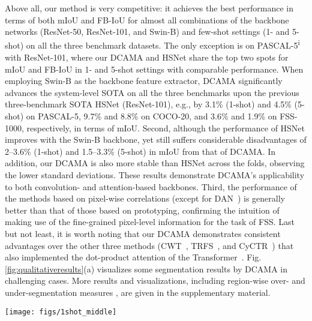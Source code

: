 \documentclass[runningheads,table,xcdraw]{llncs}
\begin{document}
Above all, our method
{\color{blue} is very competitive: it achieves the best performance in terms of both mIoU and FB-IoU for almost all combinations of the backbone networks (ResNet-50, ResNet-101, and Swin-B) and few-shot settings (1- and 5-shot) on all the three benchmark datasets.
The only exception is on PASCAL-5\textsuperscript{i} with ResNet-101, where {\color{red}our DCAMA and HSNet \cite{min2021hypercorrelation} share the top two spots for mIoU and FB-IoU in 1- and 5-shot settings with comparable performance}.
When employing Swin-B as the backbone feature extractor, DCAMA significantly advances the system-level SOTA on all the three benchmarks upon the previous three-benchmark SOTA HSNet (ResNet-101), e.g., by 3.1\% (1-shot) and 4.5\% (5-shot) on PASCAL-5, 9.7\% and 8.8\% on COCO-20, and 3.6\% and 1.9\% on FSS-1000, respectively, in terms of mIoU.
Second,
although the performance of HSNet improves with the Swin-B backbone,
yet still suffers considerable disadvantages of 2--3.6\% (1-shot) and 1.5--3.3\% (5-shot) in mIoU from that of DCAMA.
In addition, our DCAMA is also more stable than HSNet across the folds, observing the lower standard deviations.
These results demonstrate DCAMA's applicability to both convolution- and attention-based backbones.}
Third, the performance of the methods based on pixel-wise correlations (except for DAN~\cite{wang2020few}) is generally better than that of those based on prototyping, confirming the intuition of making use of the fine-grained pixel-level information for the task of FSS.
{\color{blue}Last but not least, it is worth noting that our DCAMA demonstrates consistent advantages over the other three methods (CWT~\cite{lu2021simpler}, TRFS~\cite{sun2021boosting}, and CyCTR~\cite{zhang2021few}) that also implemented the dot-product attention of the Transformer~\cite{vaswani2017attention}.}
Fig. \ref{fig:qualitativeresults}(a) visualizes some segmentation results by DCAMA in challenging cases.
More results and visualizations, including region-wise over- and under-segmentation measures \cite{zhang2021rethinking}, are given in the supplementary material.


\begin{figure*}[!t]
  \centering
  \texttt{[image: figs/1shot\_middle]}
  \caption{(a) Qualitative results on PASCAL-5 in 1-shot setting, in the presence of intra-class variations, size differences, complex background, and occlusions.
  (b) Multi-scale intermediate query masks aggregated by the multi-layer DCAMA blocks for a 1-shot task sampled from PASCAL-5.}
  \label{fig:qualitativeresults}
\end{figure*}
\end{document}
